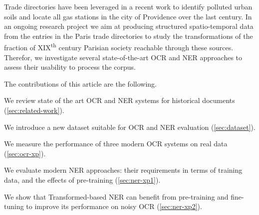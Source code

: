 Trade directories have been leveraged in a recent work to identify polluted urban soils \cite{bell2020automated} and locate all gas stations in the city of Providence over the last century.
In an ongoing research project we aim at producing structured spatio-temporal data from the entries in the Paris trade directories to study the transformations of the fraction of XIX\textsuperscript{th} century Parisian society reachable through these sources.
Therefor, we investigate several state-of-the-art OCR and NER approaches to assess their usability to process the corpus.

The contributions of this article are the following.
\begin{enumerate*}[(i)]
    \item We review state of the art OCR and NER systems for historical documents (\cref{sec:related-work}).
    \item We introduce a new dataset suitable for OCR and NER evaluation (\cref{sec:dataset}).
    \item We measure the performance of three modern OCR systems on real data (\cref{sec:ocr-xp}).
    \item We evaluate modern NER approaches: their requirements in terms of training data, and the effects of pre-training (\cref{sec:ner-xp1}).
    \item We show that Transformed-based NER can benefit from pre-training and fine-tuning to improve its performance on noisy OCR (\cref{sec:ner-xp2}).
\end{enumerate*}


